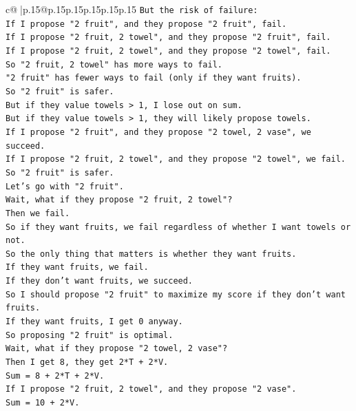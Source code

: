 \documentclass{article}
\begin{document}
{\begin{supertabular}{c@{$\;$}|p{.15\linewidth}@{}p{.15\linewidth}p{.15\linewidth}p{.15\linewidth}p{.15\linewidth}p{.15\linewidth}}
{{{\texttt{But the risk of failure:} \\
\texttt{If I propose "2 fruit", and they propose "2 fruit", fail.} \\
\texttt{If I propose "2 fruit, 2 towel", and they propose "2 fruit", fail.} \\
\texttt{If I propose "2 fruit, 2 towel", and they propose "2 towel", fail.} \\
\texttt{So "2 fruit, 2 towel" has more ways to fail.} \\
\texttt{"2 fruit" has fewer ways to fail (only if they want fruits).} \\
\texttt{So "2 fruit" is safer.} \\
\texttt{But if they value towels > 1, I lose out on sum.} \\
\texttt{But if they value towels > 1, they will likely propose towels.} \\
\texttt{If I propose "2 fruit", and they propose "2 towel, 2 vase", we succeed.} \\
\texttt{If I propose "2 fruit, 2 towel", and they propose "2 towel", we fail.} \\
\texttt{So "2 fruit" is safer.} \\
\texttt{Let's go with "2 fruit".} \\
\texttt{Wait, what if they propose "2 fruit, 2 towel"?} \\
\texttt{Then we fail.} \\
\texttt{So if they want fruits, we fail regardless of whether I want towels or not.} \\
\texttt{So the only thing that matters is whether they want fruits.} \\
\texttt{If they want fruits, we fail.} \\
\texttt{If they don't want fruits, we succeed.} \\
\texttt{So I should propose "2 fruit" to maximize my score if they don't want fruits.} \\
\texttt{If they want fruits, I get 0 anyway.} \\
\texttt{So proposing "2 fruit" is optimal.} \\
\texttt{Wait, what if they propose "2 towel, 2 vase"?} \\
\texttt{Then I get 8, they get 2*T + 2*V.} \\
\texttt{Sum = 8 + 2*T + 2*V.} \\
\texttt{If I propose "2 fruit, 2 towel", and they propose "2 vase".} \\
\texttt{Sum = 10 + 2*V.} \\
}}}
\end{supertabular}}
\end{document}
